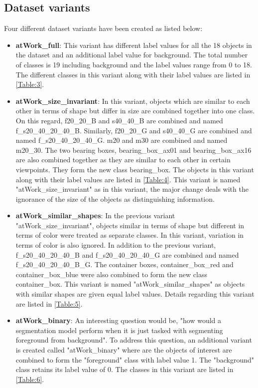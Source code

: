 \documentclass[paper=a4,11pt,parskip=half,toc=listof]{scrartcl}
\begin{document}
	\subsection{Dataset variants}
	\label{section:analysis}
	Four different dataset variants have been created as listed below:
	\begin{itemize}
		\item \textbf{atWork\_full}: This variant has different label values for all the 18 objects in the dataset and an additional label value for background. The total number of classes is 19 including background and the label values range from 0 to 18. The different classes in this variant along with their label values are listed in \ref{Table:3}.
		\item \textbf{atWork\_size\_invariant}: In this variant, objects which are similar to each other in terms of shape but differ in size are combined together into one class. On this regard, f20\_20\_B and s40\_40\_B are combined and named f\_s20\_40\_20\_40\_B. Similarly, f20\_20\_G and s40\_40\_G are combined and named f\_s20\_40\_20\_40\_G. m20 and m30 are combined and named m20\_30. The two bearing boxes, bearing\_box\_ax01 and bearing\_box\_ax16 are also combined together as they are similar to each other in certain viewpoints. They form the new class bearing\_box. The objects in this variant along with their label values are listed in \ref{Table:4}. This variant is named "atWork\_size\_invariant" as in this variant, the major change deals with the ignorance of the size of the objects as distinguishing information.
		\item \textbf{atWork\_similar\_shapes}: In the previous variant "atWork\_size\_invariant", objects similar in terms of shape but different in terms of color were treated as separate classes. In this variant, variation in terms of color is also ignored. In addition to the previous variant, f\_s20\_40\_20\_40\_B and f\_s20\_40\_20\_40\_G are combined and named f\_s20\_40\_20\_40\_B\_G. The container boxes, container\_box\_red and container\_box\_blue were also combined to form the new class container\_box. This variant is named "atWork\_similar\_shapes" as objects with similar shapes are given equal label values. Details regarding this variant are listed in \ref{Table:5}.
		\item \textbf{atWork\_binary}: An interesting question would be, "how would a segmentation model perform when it is just tasked with segmenting foreground from background". To address this question, an additional variant is created called "atWork\_binary" where are the objects of interest are combined to form the "foreground" class with label value 1. The "background" class retains its label value of 0. The classes in this variant are listed in \ref{Table:6}.
		

\end{itemize}
\end{document}
